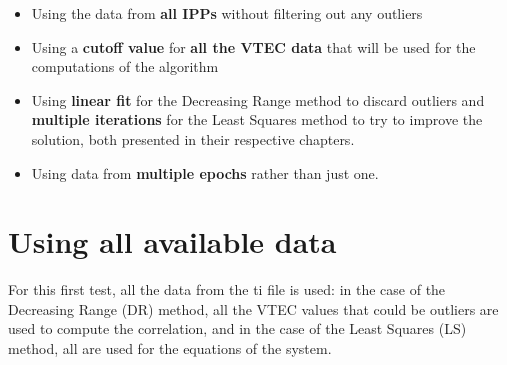 \begin{itemize}
	\item Using the data from \textbf{all IPPs} without filtering out any outliers
	\item Using a \textbf{cutoff value} for \textbf{all the VTEC data} that will be used for the computations of the algorithm
	\item Using \textbf{linear fit} for the Decreasing Range method to discard outliers and \textbf{multiple iterations} for the Least Squares method to try to improve the solution, both presented in their respective chapters.
	\item Using data from \textbf{multiple epochs} rather than just one.
\end{itemize}

\clearpage

\section{Using all available data}

For this first test, all the data from the ti file is used: in the case of the Decreasing Range (DR) method, all the VTEC values that could be outliers are used to compute the correlation, and in the case of the Least Squares (LS) method, all are used for the equations of the system.


